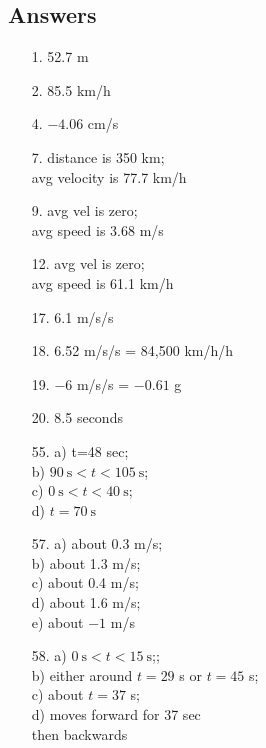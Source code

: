 \documentclass[10pt]{exam}
\begin{document}



\subsection*{Answers}

\begin{multicols}{3}

  \begin{itemize}[noitemsep]
    \item[1.]  52.7 m
    \item[2.]  85.5 km/h
    \item[4.]  $-4.06$ cm/s
    \item[7.]  distance is 350 km; \\
               avg velocity is 77.7 km/h
    \item[9.]  avg vel is zero; \\
               avg speed is 3.68 m/s
    \item[12.] avg vel is zero; \\
               avg speed is 61.1 km/h
    \item[17.] 6.1 m/s/s
    \item[18.] 6.52 m/s/s = 84,500 km/h/h
    \item[19.] $-6$ m/s/s = $-0.61$ g
    \item[20.] 8.5 seconds
    \item[55.] a) t=48 sec;  \\ 
               b) $\SI{90}{\second} < t < \SI{105}{\second}$; \\
               c) $\SI{0}{\second} < t < \SI{40}{\second}$; \\
               d) $t=\SI{70}{\second}$
    \item[57.] a) about 0.3 m/s;  \\
               b) about 1.3 m/s;  \\
               c) about 0.4 m/s;  \\
               d) about 1.6 m/s;  \\ 
               e) about $-1$ m/s
    \item[58.] a) $\SI{0}{\second} < t < \SI{15}{\second}$;;  \\
               b) either around $t=29$ s or $t=45$ s; \\
               c) about $t=37$ s; \\
               d) moves forward for 37 sec \\ \hspace*{5em} then backwards
  \end{itemize}
  
\end{multicols}
\end{document}
